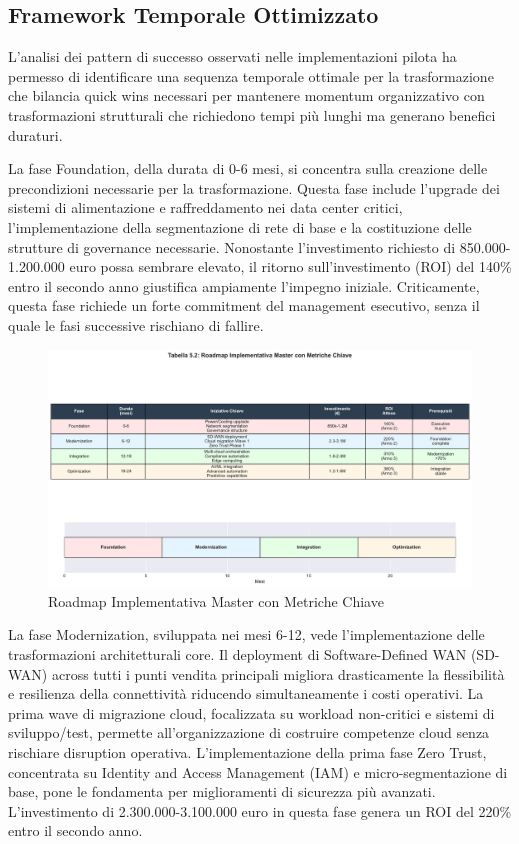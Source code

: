 \subsection{Framework Temporale Ottimizzato}

L'analisi dei pattern di successo osservati nelle implementazioni pilota ha permesso di identificare una sequenza temporale ottimale per la trasformazione che bilancia quick wins necessari per mantenere momentum organizzativo con trasformazioni strutturali che richiedono tempi più lunghi ma generano benefici duraturi.

La fase Foundation, della durata di 0-6 mesi, si concentra sulla creazione delle precondizioni necessarie per la trasformazione. Questa fase include l'upgrade dei sistemi di alimentazione e raffreddamento nei data center critici, l'implementazione della segmentazione di rete di base e la costituzione delle strutture di governance necessarie. Nonostante l'investimento richiesto di 850.000-1.200.000 euro possa sembrare elevato, il ritorno sull'investimento (ROI) del 140\% entro il secondo anno giustifica ampiamente l'impegno iniziale. Criticamente, questa fase richiede un forte commitment del management esecutivo, senza il quale le fasi successive rischiano di fallire.

\begin{figure}[htbp]
\centering
\includegraphics[width=1\textwidth]{thesis_figures/cap5/tab_5_2_roadmap.pdf}
\caption{Roadmap Implementativa Master con Metriche Chiave}
\label{tab:roadmap_master}
\end{figure}

La fase Modernization, sviluppata nei mesi 6-12, vede l'implementazione delle trasformazioni architetturali core. Il deployment di Software-Defined WAN (SD-WAN) across tutti i punti vendita principali migliora drasticamente la flessibilità e resilienza della connettività riducendo simultaneamente i costi operativi. La prima wave di migrazione cloud, focalizzata su workload non-critici e sistemi di sviluppo/test, permette all'organizzazione di costruire competenze cloud senza rischiare disruption operativa. L'implementazione della prima fase Zero Trust, concentrata su Identity and Access Management (IAM) e micro-segmentazione di base, pone le fondamenta per miglioramenti di sicurezza più avanzati. L'investimento di 2.300.000-3.100.000 euro in questa fase genera un ROI del 220\% entro il secondo anno.

